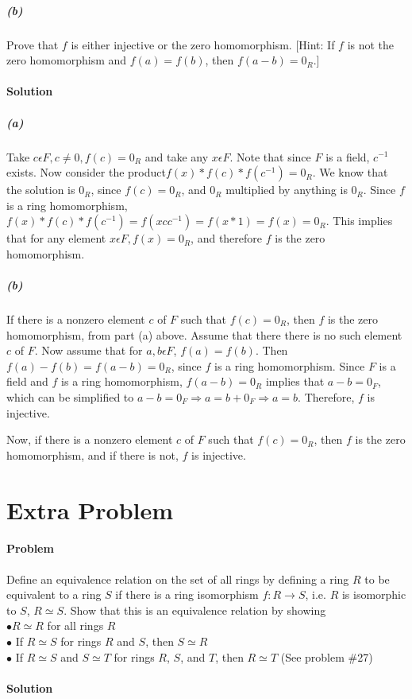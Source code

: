 \documentclass[a4paper,11pt]{article}
\begin{document}
\subparagraph{(b)}
Prove that $f$ is either injective or the zero homomorphism. [Hint: If $f$ is not the zero homomorphism and $f(a)= f(b)$, then $f(a-b) = 0_R$.]

\paragraph{Solution}
\subparagraph{(a)}
Take $c \epsilon F, c \neq 0, f(c) = 0_R$ and take any $x \epsilon F$. Note that since $F$ is a field, $c^{-1}$ exists. Now consider the product$f(x)*f(c)*f(c^{-1}) = 0_R$. We know that the solution is $0_R$, since $f(c) = 0_R$, and $0_R$ multiplied by anything is $0_R$. Since $f$ is a ring homomorphism, $f(x)*f(c)*f(c^{-1}) = f(xcc^{-1}) = f(x*1) = f(x) = 0_R$. This implies that for any element $x \epsilon F, f(x) = 0_R$, and therefore $f$ is the zero homomorphism.

\subparagraph{(b)}
If there is a nonzero element $c$ of $F$ such that $f(c) = 0_R$, then $f$ is the zero homomorphism, from part (a) above. Assume that there there is no such element $c$ of $F$. Now assume that for $a,b \epsilon F$, $f(a) = f(b)$. Then $f(a) - f(b) = f(a-b) = 0_R$, since $f$ is a ring homomorphism. Since $F$ is a field and $f$ is a ring homomorphism, $f(a-b) = 0_R$ implies that $a-b = 0_F$, which can be simplified to $a-b = 0_F \Rightarrow a = b + 0_F \Rightarrow a = b$. Therefore, $f$ is injective.

Now, if there is a nonzero element $c$ of $F$ such that $f(c) = 0_R$, then $f$ is the zero homomorphism, and if there is not, $f$ is injective.

\section{Extra Problem}
\paragraph{Problem}
Define an equivalence relation on the set of all rings by defining a ring $R$ to be equivalent to a ring $S$ if there is a ring isomorphism $f: R \rightarrow S$, i.e. $R$ is isomorphic to $S$, $R \simeq S$. 
Show that this is an equivalence relation by showing\\
$\bullet R \simeq R$ for all rings $R$\\
$\bullet$ If $R \simeq S$ for rings $R$ and $S$, then $S \simeq R$\\
$\bullet$ If $R \simeq S$ and $S \simeq T$ for rings $R$, $S$, and $T$, then $R \simeq T$ (See problem \#27)

\paragraph{Solution}
\end{document}
